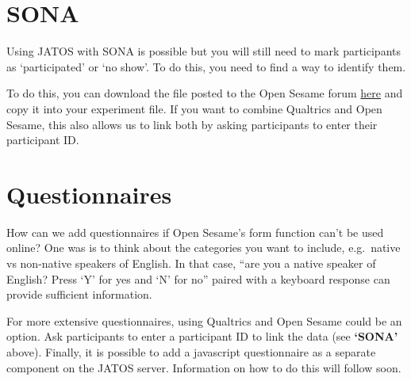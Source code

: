 \documentclass[
]{book}
\begin{document}
\hypertarget{sona}{%
\section{SONA}\label{sona}}

Using JATOS with SONA is possible but you will still need to mark participants as `participated' or `no show'. To do this, you need to find a way to identify them.

To do this, you can download the file posted to the Open Sesame forum \href{https://forum.cogsci.nl/discussion/5876/}{here} and copy it into your experiment file. If you want to combine Qualtrics and Open Sesame, this also allows us to link both by asking participants to enter their participant ID.

\hypertarget{questionnaires}{%
\section{Questionnaires}\label{questionnaires}}

How can we add questionnaires if Open Sesame's form function can't be used online? One was is to think about the categories you want to include, e.g.~native vs non-native speakers of English. In that case, ``are you a native speaker of English? Press `Y' for yes and `N' for no'' paired with a keyboard response can provide sufficient information.

For more extensive questionnaires, using Qualtrics and Open Sesame could be an option. Ask participants to enter a participant ID to link the data (see \textbf{`SONA'} above). Finally, it is possible to add a javascript questionnaire as a separate component on the JATOS server. Information on how to do this will follow soon.
\end{document}
